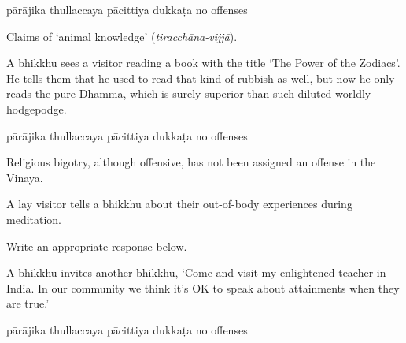 \begin{exam}{\autoExamName}
\begin{problem*}
\begin{parts}
  \bigskip

  \begin{answers}{5}
    \bChoices
     pārājika\eAns
     thullaccaya\eAns
     pācittiya\eAns
     dukkaṭa\eAns
     no offenses\eAns
    \eChoices
  \end{answers}

  \begin{solution}
    Claims of `animal knowledge' (\emph{tiracchāna-vijjā}).
  \end{solution}

  \bigskip

  \item A bhikkhu sees a visitor reading a book with the title `The Power of the Zodiacs'.
  He tells them that he used to read that kind of rubbish as well,
  but now he only reads the pure Dhamma,
  which is surely superior than such diluted worldly hodgepodge.

  \bigskip

  \begin{answers}{5}
    \bChoices
     pārājika\eAns
     thullaccaya\eAns
     pācittiya\eAns
     dukkaṭa\eAns
     no offenses\eAns
    \eChoices
  \end{answers}

  \begin{solution}
    Religious bigotry, although offensive, has not been assigned an offense in the Vinaya.
  \end{solution}

  \bigskip

  \item A lay visitor tells a bhikkhu about their out-of-body experiences during meditation.

  Write an appropriate response below.

  \bigskip


  \bigskip

  \item A bhikkhu invites another bhikkhu, `Come and visit my enlightened teacher in India. In our community we think it's OK to speak about attainments when they are true.'

  \bigskip

  \begin{answers}{5}
    \bChoices
     pārājika\eAns
     thullaccaya\eAns
     pācittiya\eAns
     dukkaṭa\eAns
     no offenses\eAns
    \eChoices
  \end{answers}


\end{parts}
\end{problem*}
\end{exam}
